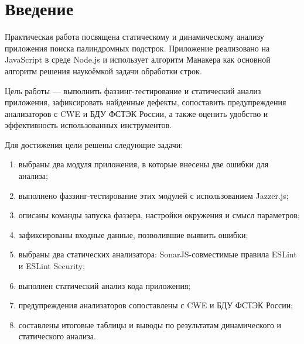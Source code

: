 \chapter*{Введение}

Практическая работа посвящена статическому и динамическому анализу приложения
поиска палиндромных подстрок. Приложение реализовано на JavaScript в среде
Node.js и использует алгоритм Манакера как основной алгоритм решения наукоёмкой
задачи обработки строк.

Цель работы --- выполнить фаззинг-тестирование и статический анализ приложения,
зафиксировать найденные дефекты, сопоставить предупреждения анализаторов с CWE и
БДУ ФСТЭК России, а также оценить удобство и эффективность использованных
инструментов.

Для достижения цели решены следующие задачи:
\begin{enumerate}
    \item выбраны два модуля приложения, в которые внесены две ошибки для анализа;
    \item выполнено фаззинг-тестирование этих модулей с использованием Jazzer.js;
    \item описаны команды запуска фаззера, настройки окружения и смысл параметров;
    \item зафиксированы входные данные, позволившие выявить ошибки;
    \item выбраны два статических анализатора: SonarJS-совместимые правила ESLint и ESLint Security;
    \item выполнен статический анализ кода приложения;
    \item предупреждения анализаторов сопоставлены с CWE и БДУ ФСТЭК России;
    \item составлены итоговые таблицы и выводы по результатам динамического и статического анализа.
\end{enumerate}
